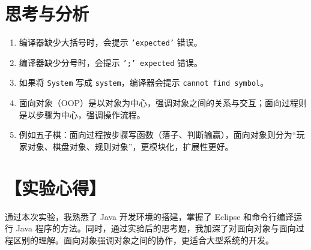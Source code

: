\documentclass[12pt,a4paper]{article}
\begin{document}
\section*{思考与分析}
\begin{enumerate}
    \item 编译器缺少大括号时，会提示 \texttt{'expected'} 错误。
    \item 编译器缺少分号时，会提示 \texttt{';' expected} 错误。
    \item 如果将 \texttt{System} 写成 \texttt{system}，编译器会提示 \texttt{cannot find symbol}。
    \item 面向对象（OOP）是以对象为中心，强调对象之间的关系与交互；面向过程则是以步骤为中心，强调操作流程。  
    \item 例如五子棋：面向过程按步骤写函数（落子、判断输赢），面向对象则分为“玩家对象、棋盘对象、规则对象”，更模块化，扩展性更好。
\end{enumerate}

\section*{【实验心得】}
通过本次实验，我熟悉了 Java 开发环境的搭建，掌握了 Eclipse 和命令行编译运行 Java 程序的方法。同时，通过实验后的思考题，我加深了对面向对象与面向过程区别的理解。面向对象强调对象之间的协作，更适合大型系统的开发。
\end{document}
